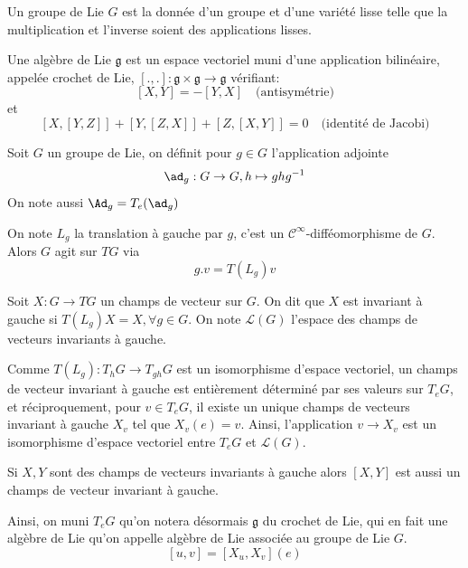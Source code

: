 
\begin{defi}
Un groupe de Lie $G$ est la donnée d'un groupe et d'une variété lisse telle que la multiplication et l'inverse soient des applications lisses.
\end{defi}

\begin{defi}
Une algèbre de Lie $\mathfrak{g}$ est un espace vectoriel muni d'une application bilinéaire, appelée crochet de Lie, $[.,.] : \mathfrak{g}\times\mathfrak{g} \to \mathfrak{g}$ vérifiant:
$$[X, Y] = - [Y, X] \quad \text{(antisymétrie)}$$
et $$[X, [Y, Z]] + [Y, [Z, X]] + [Z, [X, Y]] = 0 \quad \text{(identité de Jacobi)}$$
\end{defi}

\begin{defi}
Soit $G$ un groupe de Lie, on définit pour $g\in G$ l'application adjointe 
$$\ad_g : G \to G, h \mapsto ghg^{-1}$$ 
On note aussi $\Ad_g = T_e(\ad_g)$ \\
\end{defi}

On note $L_g$ la translation à gauche par $g$, c'est un $\mathscr{C}^\infty$-difféomorphisme de $G$. Alors $G$ agit sur $TG$ via 
$$g.v = T(L_g)v$$

\begin{defi}
Soit $X: G \to TG$ un champs de vecteur sur $G$. On dit que $X$ est invariant à gauche si $T(L_g)X = X, \forall g\in G$. On note $\mathcal{L}(G)$ l'espace des champs de vecteurs invariants à gauche.\\
\end{defi}

Comme $T(L_g) : T_hG\to T_{gh}G$ est un isomorphisme d'espace vectoriel, un champs de vecteur invariant à gauche est entièrement déterminé par ses valeurs sur $T_eG$, et réciproquement, pour $v\in T_eG$, il existe un unique champs de vecteurs invariant à gauche $X_v$ tel que $X_v(e)=v$. Ainsi, l'application $v\to X_v$ est un isomorphisme d'espace vectoriel entre $T_eG$ et $\mathcal{L}(G)$. \\

\begin{pro}
Si $X, Y$ sont des champs de vecteurs invariants à gauche alors $[X, Y]$ est aussi un champs de vecteur invariant à gauche. 
\end{pro}

Ainsi, on muni $T_eG$ qu'on notera désormais $\mathfrak{g}$ du crochet de Lie, qui en fait une algèbre de Lie qu'on appelle algèbre de Lie associée au groupe de Lie $G$.
$$[u, v] = [X_u, X_v](e)$$ \\

